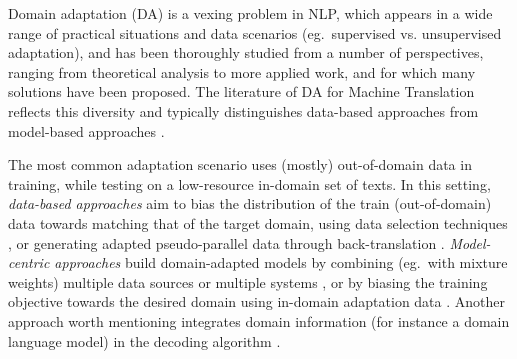 \documentclass[11pt,a4paper]{article}
\newcommand{\fyTodo}[1]{\Todo[FY:]{\textcolor{orange}{#1}}}
\begin{document}

Domain adaptation (DA) is a vexing problem in NLP, which appears in a wide range of practical situations and data scenarios (eg.\ supervised vs. unsupervised adaptation), and  has been thoroughly  studied from a number of perspectives, ranging from theoretical analysis to more applied work, and for which many solutions have been proposed. The literature of DA for Machine Translation reflects this diversity and typically distinguishes data-based approaches from model-based approaches \cite{Chu2017comparison,Chu18asurvey}.

The most common adaptation scenario uses (mostly) out-of-domain data in training, while testing on a low-resource in-domain set of texts. In this setting, \emph{data-based approaches} aim to bias the distribution of the train (out-of-domain) data towards matching that of the target domain, using data selection techniques \cite{Moore10selection,Axelrod11domain,Duh13selection}, or generating adapted pseudo-parallel data through back-translation  \cite{Utiyama03measure,Wang14neural,Wang16connecting,Sennrich16improving}. \emph{Model-centric approaches} build domain-adapted models by combining (eg.\ with mixture weights) multiple data sources or multiple systems \cite{Foster07mixture,Wang17instance}, or by biasing the training objective towards the desired domain using in-domain adaptation data \cite{Luong15stanford,Freitag16fast,Chen17costweighting}. Another approach worth mentioning integrates domain information (for instance a domain language model) in the decoding algorithm \cite{Gulcehre17onintegrating}.
\end{document}

